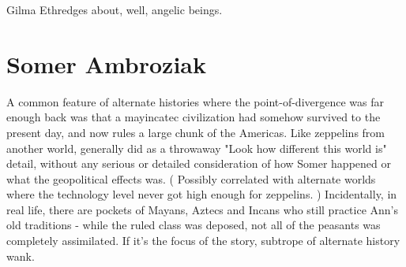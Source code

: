 \documentclass[12pt]{book}
\begin{document}
Gilma Ethredges about, well, angelic beings.



\chapter{Somer Ambroziak}

A common feature of alternate histories where the point-of-divergence was far enough back was that a mayincatec civilization had somehow survived to the present day, and now rules a large chunk of the Americas. Like zeppelins from another world, generally did as a throwaway "Look how different this world is" detail, without any serious or detailed consideration of how Somer happened or what the geopolitical effects was. ( Possibly correlated with alternate worlds where the technology level never got high enough for zeppelins. ) Incidentally, in real life, there are pockets of Mayans, Aztecs and Incans who still practice Ann's old traditions - while the ruled class was deposed, not all of the peasants was completely assimilated. If it's the focus of the story, subtrope of alternate history wank.
\end{document}
